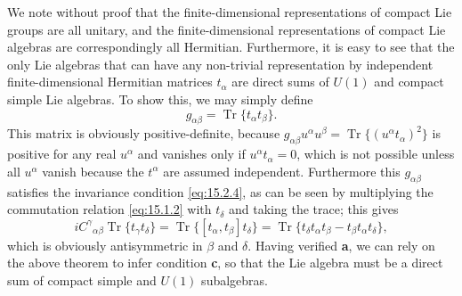 We note without proof that the finite-dimensional representations of compact Lie
groups are all unitary, and the finite-dimensional representations of compact Lie
algebras are correspondingly all Hermitian. Furthermore, it is easy to see that
the only Lie algebras that can have any non-trivial representation by independent
finite-dimensional Hermitian matrices $t_\alpha$ are direct sums of $U(1)$ and
compact simple Lie algebras. To show this, we may simply define
\[
 g_{\alpha\beta}=\operatorname{Tr}\{t_\alpha t_\beta\} .
\]
This matrix is obviously positive-definite, because
$g_{\alpha\beta}u^\alpha u^\beta=\operatorname{Tr}\{(u^\alpha t_\alpha)^2\}$
is positive for any real $u^\alpha$ and vanishes only if $u^\alpha t_\alpha=0$,
which is not possible unless all $u^\alpha$ vanish because the $t^\alpha$ are
assumed independent. Furthermore this $g_{\alpha\beta}$ satisfies the invariance
condition \eqref{eq:15.2.4}, as can be seen by multiplying the commutation
relation \eqref{eq:15.1.2} with $t_\delta$ and taking the trace; this gives
\[
 iC^\gamma{}_{\alpha\beta}\operatorname{Tr}\{t_\gamma t_\delta\}
 =\operatorname{Tr}\{[t_\alpha,t_\beta]t_\delta\}
 =\operatorname{Tr}\{t_\delta t_\alpha t_\beta-t_\beta t_\alpha t_\delta\} ,
\]
which is obviously antisymmetric in $\beta$ and $\delta$. Having verified
\textbf{a}, we can rely on the above theorem to infer condition \textbf{c}, so
that the Lie algebra must be a direct sum of compact simple and $U(1)$
subalgebras.

